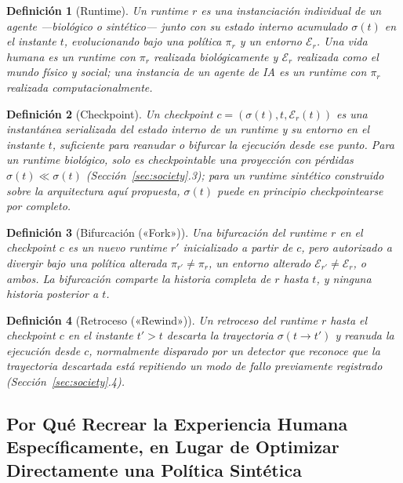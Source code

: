 \documentclass[11pt]{article}
\newtheorem{definition}{Definición}
\begin{document}
\begin{definition}[Runtime]
Un \emph{runtime} $r$ es una instanciación individual de un agente —biológico o sintético— junto con su estado interno acumulado $\sigma(t)$ en el instante $t$, evolucionando bajo una política $\pi_r$ y un entorno $\mathcal{E}_r$. Una vida humana es un runtime con $\pi_r$ realizada biológicamente y $\mathcal{E}_r$ realizada como el mundo físico y social; una instancia de un agente de IA es un runtime con $\pi_r$ realizada computacionalmente.
\end{definition}

\begin{definition}[Checkpoint]
Un \emph{checkpoint} $c = (\sigma(t), t, \mathcal{E}_r(t))$ es una instantánea serializada del estado interno de un runtime y su entorno en el instante $t$, suficiente para reanudar o bifurcar la ejecución desde ese punto. Para un runtime biológico, solo es checkpointable una proyección con pérdidas $\hat{\sigma}(t) \ll \sigma(t)$ (Sección~\ref{sec:society}.3); para un runtime sintético construido sobre la arquitectura aquí propuesta, $\sigma(t)$ puede en principio checkpointearse por completo.
\end{definition}

\begin{definition}[Bifurcación («Fork»)]
Una \emph{bifurcación} del runtime $r$ en el checkpoint $c$ es un nuevo runtime $r'$ inicializado a partir de $c$, pero autorizado a divergir bajo una política alterada $\pi_{r'} \neq \pi_r$, un entorno alterado $\mathcal{E}_{r'} \neq \mathcal{E}_r$, o ambos. La bifurcación comparte la historia completa de $r$ hasta $t$, y ninguna historia posterior a $t$.
\end{definition}

\begin{definition}[Retroceso («Rewind»)]
Un \emph{retroceso} del runtime $r$ hasta el checkpoint $c$ en el instante $t' > t$ descarta la trayectoria $\sigma(t \to t')$ y reanuda la ejecución desde $c$, normalmente disparado por un detector que reconoce que la trayectoria descartada está repitiendo un modo de fallo previamente registrado (Sección~\ref{sec:society}.4).
\end{definition}

\subsection{Por Qué Recrear la Experiencia Humana Específicamente, en Lugar de Optimizar Directamente una Política Sintética}
\end{document}
